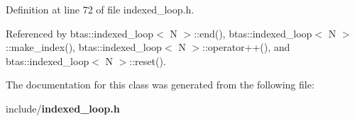 Definition at line 72 of file indexed\-\_\-loop.\-h.



Referenced by btas\-::indexed\-\_\-loop$<$ N $>$\-::end(), btas\-::indexed\-\_\-loop$<$ N $>$\-::make\-\_\-index(), btas\-::indexed\-\_\-loop$<$ N $>$\-::operator++(), and btas\-::indexed\-\_\-loop$<$ N $>$\-::reset().



The documentation for this class was generated from the following file\-:\begin{DoxyCompactItemize}
\item 
include/{\bf indexed\-\_\-loop.\-h}\end{DoxyCompactItemize}
